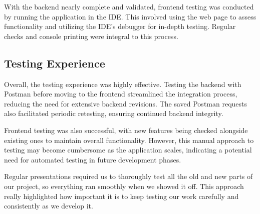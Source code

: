 With the backend nearly complete and validated, frontend testing was conducted by running the application in the IDE. This involved using the web page to assess functionality and utilizing the IDE's debugger for in-depth testing. Regular checks and console printing were integral to this process.

\subsection{Testing Experience}

Overall, the testing experience was highly effective. Testing the backend with Postman before moving to the frontend streamlined the integration process, reducing the need for extensive backend revisions. The saved Postman requests also facilitated periodic retesting, ensuring continued backend integrity.

Frontend testing was also successful, with new features being checked alongside existing ones to maintain overall functionality. However, this manual approach to testing may become cumbersome as the application scales, indicating a potential need for automated testing in future development phases.

Regular presentations required us to thoroughly test all the old and new parts of our project, so everything ran smoothly when we showed it off. This approach really highlighted how important it is to keep testing our work carefully and consistently as we develop it.
